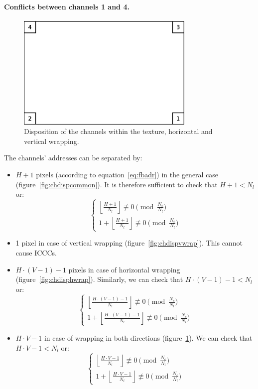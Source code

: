 \documentclass[a4paper,11pt]{kthesis}
\begin{document}
\paragraph{Conflicts between channels 1 and 4.}
\begin{figure}[htp]
\centering
\includegraphics[height=55mm]{chdisp_hvwrap.eps}
\caption{Disposition of the channels within the texture, horizontal and vertical wrapping.}\label{fig:chdisphvwrap}
\end{figure}
The channels' addresses can be separated by:
\begin{itemize}
\item $H + 1$ pixels (according to equation~\ref{eq:fbadr}) in the general case (figure~\ref{fig:chdispcommon}). It is therefore sufficient to check that $H+1 < N_{l}$ or:
\begin{equation}
\begin{cases}
\left\lfloor \frac{H+1}{N_{l}} \right\rfloor \not \equiv 0 \pmod{\frac{N_{c}}{N_{l}}} \\
1 + \left\lfloor \frac{H+1}{N_{l}} \right\rfloor \not \equiv 0 \pmod{\frac{N_{c}}{N_{l}}}
\end{cases}
\end{equation}
\item 1 pixel in case of vertical wrapping (figure~\ref{fig:chdispvwrap}). This cannot cause ICCCs.
\item $H \cdot (V-1) - 1$ pixels in case of horizontal wrapping (figure~\ref{fig:chdisphwrap}). Similarly, we can check that $H \cdot (V-1) - 1 < N_{l}$ or:
\begin{equation}
\begin{cases}
\left\lfloor \frac{H \cdot (V-1) - 1}{N_{l}} \right\rfloor \not \equiv 0 \pmod{\frac{N_{c}}{N_{l}}} \\
1 + \left\lfloor \frac{H \cdot (V-1) - 1}{N_{l}} \right\rfloor \not \equiv 0 \pmod{\frac{N_{c}}{N_{l}}}
\end{cases}
\end{equation}
\item $H \cdot V - 1$ in case of wrapping in both directions (figure~\ref{fig:chdisphvwrap}). We can check that $H \cdot V - 1 < N_{l}$ or:
\begin{equation}
\begin{cases}
\left\lfloor \frac{H \cdot V - 1}{N_{l}} \right\rfloor \not \equiv 0 \pmod{\frac{N_{c}}{N_{l}}} \\
1 + \left\lfloor \frac{H \cdot V - 1}{N_{l}} \right\rfloor \not \equiv 0 \pmod{\frac{N_{c}}{N_{l}}}
\end{cases}
\end{equation}
\end{itemize}
\end{document}
